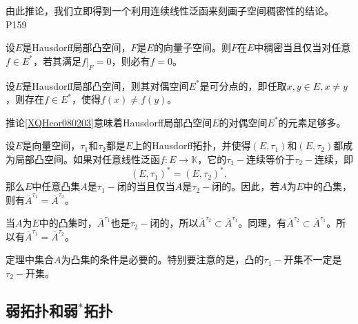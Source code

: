 \original
{
	由此推论，我们立即得到一个利用连续线性泛函来刻画子空间稠密性的结论。
}
{P159}

\begin{corollary}
设$E$是Hausdorff局部凸空间，$F$是$E$的向量子空间。则$F$在$E$中稠密当且仅当对任意$f\in E^{*}$，若其满足$f\big|_{F}=0$，则必有$f=0$。
\end{corollary}


\begin{corollary}\label{XQHcor080203}
	设$E$是Hausdorff局部凸空间，则其对偶空间$E^{*}$是可分点的，即任取$x,y\in E,x\neq y$，则存在$f\in E^{*}$，使得$f(x)\neq f(y)$。
\end{corollary}

\begin{remark}
	推论\ref{XQHcor080203}意味着Hausdorff局部凸空间$E$的对偶空间$E^{*}$的元素足够多。
\end{remark}

\begin{corollary}[Mazur 定理]\label{XQHcor070205}
	设$E$是向量空间，$\tau_{1}$和$\tau_{2}$都是$E$上的Hausdorff拓扑，并使得$(E,\tau_{1})$和$(E,\tau_{2})$都成为局部凸空间。如果对任意线性泛函$f:E\rightarrow\mathbb{K}$，它的$\tau_{1}-$连续等价于$\tau_{2}-$连续，即
	\begin{equation*}
		(E,\tau_{1})^{*}=(E,\tau_{2})^{*},
	\end{equation*}
	那么$E$中任意凸集$A$是$\tau_{1}-$闭的当且仅当$A$是$\tau_{2}-$闭的。因此，若$A$为$E$中的凸集，则有$\overline{A}^{\tau_{1}}=\overline{A}^{\tau_{2}}$。
\end{corollary}

\begin{remark}
	当$A$为$E$中的凸集时，$\overline{A}^{\tau_{1}}$也是$\tau_{2}-$闭的，所以$\overline{A}^{\tau_{2}}\subset \overline{A}^{\tau_{1}}$。同理，有$\overline{A}^{\tau_{2}}\subset\overline{A}^{\tau_{1}}$。所以有$\overline{A}^{\tau_{1}}=\overline{A}^{\tau_{2}}$。
\end{remark}

\begin{remark}
	定理中集合$A$为凸集的条件是必要的。特别要注意的是，凸的$\tau_{1}-$开集不一定是$\tau_{2}-$开集。
\end{remark}




\subsection{弱拓扑和弱$\!\!^{*}\!\!$拓扑}

